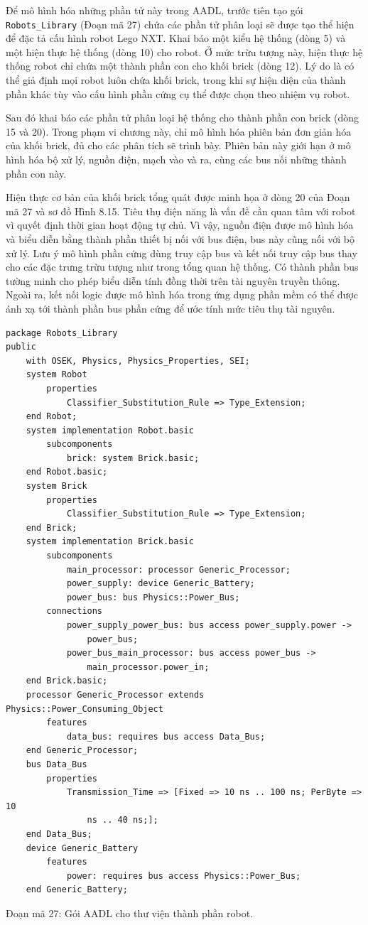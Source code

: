 Để mô hình hóa những phần tử này trong AADL, trước tiên tạo gói \texttt{Robots\_Library} (Đoạn mã 27) chứa các phần tử phân loại sẽ được tạo thể hiện để đặc tả cấu hình robot Lego NXT. Khai báo một kiểu hệ thống (dòng 5) và một hiện thực hệ thống (dòng 10) cho robot. Ở mức trừu tượng này, hiện thực hệ thống robot chỉ chứa một thành phần con cho khối brick (dòng 12). Lý do là có thể giả định mọi robot luôn chứa khối brick, trong khi sự hiện diện của thành phần khác tùy vào cấu hình phần cứng cụ thể được chọn theo nhiệm vụ robot.

Sau đó khai báo các phần tử phân loại hệ thống cho thành phần con brick (dòng 15 và 20). Trong phạm vi chương này, chỉ mô hình hóa phiên bản đơn giản hóa của khối brick, đủ cho các phân tích sẽ trình bày. Phiên bản này giới hạn ở mô hình hóa bộ xử lý, nguồn điện, mạch vào và ra, cùng các bus nối những thành phần con này.

Hiện thực cơ bản của khối brick tổng quát được minh họa ở dòng 20 của Đoạn mã 27 và sơ đồ Hình 8.15. Tiêu thụ điện năng là vấn đề cần quan tâm với robot vì quyết định thời gian hoạt động tự chủ. Vì vậy, nguồn điện được mô hình hóa và biểu diễn bằng thành phần thiết bị nối với bus điện, bus này cũng nối với bộ xử lý. Lưu ý mô hình phần cứng dùng truy cập bus và kết nối truy cập bus thay cho các đặc trưng trừu tượng như trong tổng quan hệ thống. Có thành phần bus tường minh cho phép biểu diễn tính đồng thời trên tài nguyên truyền thông. Ngoài ra, kết nối logic được mô hình hóa trong ứng dụng phần mềm có thể được ánh xạ tới thành phần bus phần cứng để ước tính mức tiêu thụ tài nguyên.

\begin{verbatim}
package Robots_Library
public
    with OSEK, Physics, Physics_Properties, SEI;
    system Robot
        properties
            Classifier_Substitution_Rule => Type_Extension;
    end Robot;
    system implementation Robot.basic
        subcomponents
            brick: system Brick.basic;
    end Robot.basic;
    system Brick
        properties
            Classifier_Substitution_Rule => Type_Extension;
    end Brick;
    system implementation Brick.basic
        subcomponents
            main_processor: processor Generic_Processor;
            power_supply: device Generic_Battery;
            power_bus: bus Physics::Power_Bus;
        connections
            power_supply_power_bus: bus access power_supply.power ->
                power_bus;
            power_bus_main_processor: bus access power_bus ->
                main_processor.power_in;
    end Brick.basic;
    processor Generic_Processor extends Physics::Power_Consuming_Object
        features
            data_bus: requires bus access Data_Bus;
    end Generic_Processor;
    bus Data_Bus
        properties
            Transmission_Time => [Fixed => 10 ns .. 100 ns; PerByte => 10
                ns .. 40 ns;];
    end Data_Bus;
    device Generic_Battery
        features
            power: requires bus access Physics::Power_Bus;
    end Generic_Battery;
\end{verbatim}
\begin{center}\small Đoạn mã 27: Gói AADL cho thư viện thành phần robot.\end{center}

